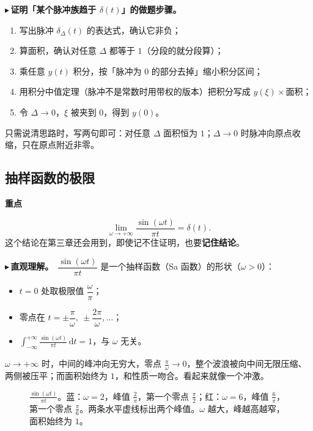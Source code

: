 \documentclass[UTF8,a4paper,11pt]{ctexart}
\newenvironment{remember}{\begin{rememberbox}\textbf{重点}\par\smallskip}{\end{rememberbox}}
\newcommand{\taxesn}[4][t]{%
  \draw[->] (#2,0) -- (#3,0) node[right,font=\scriptsize] {$#1$};
  \draw[->] (0,-0.3) -- (0,#4);}
\newcommand{\xt}[2]{\draw (#1,0) -- (#1,-0.1) node[anchor=north,font=\tiny,gray!60!black,fill=white,inner sep=0.6pt] {$#2$};}
\newcounter{ex}[section]
\newcommand{\point}[1]{\par\addvspace{1ex}\noindent\textcolor{ptteal}{$\blacktriangleright$\,\textbf{#1}}\ }
\begin{document}
\point{证明「某个脉冲族趋于 $\delta(t)$」的做题步骤。}
\begin{enumerate}[nosep]
\item 写出脉冲 $\delta_\Delta(t)$ 的表达式，确认它非负；
\item 算面积，确认对任意 $\Delta$ 都等于 $1$（分段的就分段算）；
\item 乘任意 $y(t)$ 积分，按「脉冲为 $0$ 的部分去掉」缩小积分区间；
\item 用积分中值定理（脉冲不是常数时用带权的版本）把积分写成 $y(\xi)\times$面积；
\item 令 $\Delta\to0$，$\xi$ 被夹到 $0$，得到 $y(0)$。
\end{enumerate}
只需说清思路时，写两句即可：对任意 $\Delta$ 面积恒为 $1$；$\Delta\to0$ 时脉冲向原点收缩，只在原点附近非零。


\subsection{抽样函数的极限}\label{sec:sa}
\begin{remember}
\[
\lim_{\omega\to+\infty}\frac{\sin(\omega t)}{\pi t}=\delta(t).
\]
这个结论在第三章还会用到，即使记不住证明，也要\textbf{记住结论}。
\end{remember}

\point{直观理解。}$\dfrac{\sin(\omega t)}{\pi t}$ 是一个抽样函数（Sa 函数）的形状（$\omega>0$）：
\begin{itemize}[nosep]
\item $t=0$ 处取极限值 $\dfrac\omega\pi$；
\item 零点在 $t=\pm\dfrac\pi\omega,\ \pm\dfrac{2\pi}\omega,\dots$；
\item $\displaystyle\int_{-\infty}^{+\infty}\frac{\sin(\omega t)}{\pi t}\,\mathrm{d}t=1$，与 $\omega$ 无关。
\end{itemize}
$\omega\to+\infty$ 时，中间的峰冲向无穷大，零点 $\frac\pi\omega\to0$，整个波浪被向中间无限压缩、两侧被压平；而面积始终为 $1$，和性质一吻合。看起来就像一个冲激。

\begin{figure}[H]
\centering
{}
\caption{$\frac{\sin(\omega t)}{\pi t}$。蓝：$\omega=2$，峰值 $\frac2\pi$，第一个零点 $\frac\pi2$；红：$\omega=6$，峰值 $\frac6\pi$，第一个零点 $\frac\pi6$。两条水平虚线标出两个峰值。$\omega$ 越大，峰越高越窄，面积始终为 $1$。}
\end{figure}
\end{document}
